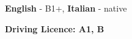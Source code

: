 \documentclass[9pt]{developercv} %
\begin{document}
    \begin{minipage}[t]{0.45\textwidth}
        \vspace{-10 pt}
        \vspace{-6pt}

        \hspace{20mm} \textbf{English} - B1+, \textbf{ Italian} - native
    \end{minipage}
    \hfill %
    \begin{minipage}[t]{0.48\textwidth}
        \vspace{-10 pt}
        \vspace{-6pt}


        \hspace{20mm} \textbf{Driving Licence: A1, B}

    \end{minipage}
\end{document}
